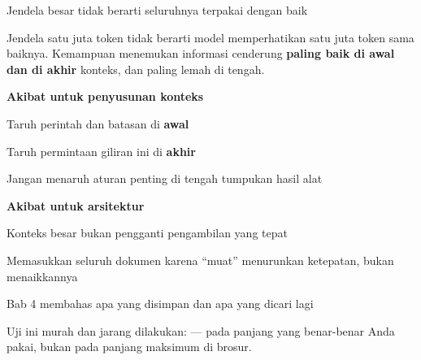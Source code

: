 \documentclass[aspectratio=169,11pt,t]{beamer}
\begin{document}
\begin{frame}[shrink=25]{Jendela besar tidak berarti seluruhnya terpakai dengan baik}
{\fontsize{9.4}{12.6}\selectfont\color{fg2}Jendela satu juta token tidak berarti model memperhatikan satu juta token sama baiknya. Kemampuan menemukan informasi cenderung \textbf{paling baik di awal dan di akhir} konteks, dan paling lemah di tengah.\par}\vskip 4pt
\begin{minipage}[t]{0.485\textwidth}
{\fontsize{9.4}{12.6}\selectfont\color{fg2}\textbf{Akibat untuk penyusunan konteks}\par}\vskip 4pt
\begin{ibullets}
\item Taruh perintah dan batasan di \textbf{awal}
\item Taruh permintaan giliran ini di \textbf{akhir}
\item Jangan menaruh aturan penting di tengah tumpukan hasil alat
\end{ibullets}

\end{minipage}%
\hfill
\begin{minipage}[t]{0.485\textwidth}
{\fontsize{9.4}{12.6}\selectfont\color{fg2}\textbf{Akibat untuk arsitektur}\par}\vskip 4pt
\begin{ibullets}
\item Konteks besar bukan pengganti pengambilan yang tepat
\item Memasukkan seluruh dokumen karena ``muat'' menurunkan ketepatan, bukan menaikkannya
\item Bab 4 membahas apa yang disimpan dan apa yang dicari lagi
\end{ibullets}

\end{minipage}%
\begin{iband}[signal]
Uji ini murah dan jarang dilakukan:  --- pada panjang yang benar-benar Anda pakai, bukan pada panjang maksimum di brosur.
\end{iband}
\end{frame}
\end{document}
